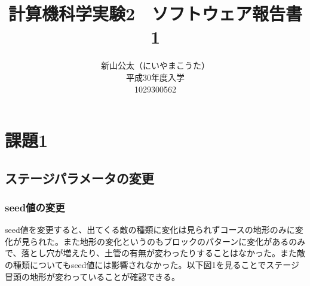 \documentclass{jsarticle}
\begin{document}
\title{計算機科学実験2　ソフトウェア報告書1}
\author{新山公太（にいやまこうた）\\平成30年度入学\\1029300562}
\maketitle

\section{課題1}
\subsection{ステージパラメータの変更}
\subsubsection{seed値の変更}
seed値を変更すると、出てくる敵の種類に変化は見られずコースの地形のみに変化が見られた。また地形の変化というのもブロックのパターンに変化があるのみで、落とし穴が増えたり、土管の有無が変わったりすることはなかった。また敵の種類についてもseed値には影響されなかった。以下図1を見ることでステージ冒頭の地形が変わっていることが確認できる。
\end{document}
